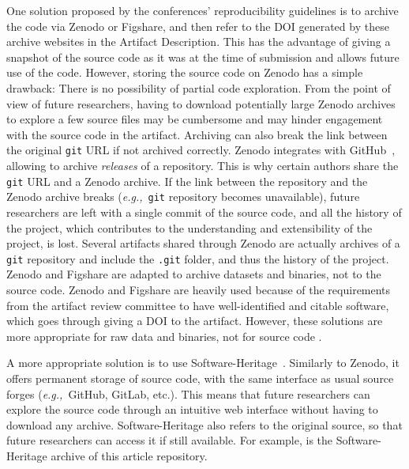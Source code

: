 \documentclass[sigconf,natbib=false]{acmart}
\newcommand{\eg}{\emph{e.g.,}}
\newcommand{\ad}{Artifact Description}
\begin{document}
One solution proposed by the conferences' reproducibility guidelines is to archive the code via Zenodo or Figshare, and then refer to the DOI generated by these archive websites in the \ad.
This has the advantage of giving a snapshot of the source code as it was at the time of submission and allows future use of the code.
However, storing the source code on Zenodo has a simple drawback: There is no possibility of partial code exploration.
From the point of view of future researchers, having to download potentially large Zenodo archives to explore a few source files may be cumbersome and may hinder engagement with the source code in the artifact. 
Archiving can also break the link between the original \texttt{git} URL if not archived correctly.
Zenodo integrates with GitHub\ \cite{github_zenodo}, allowing to archive \emph{releases} of a repository.
This is why certain authors share the \texttt{git} URL and a Zenodo archive.
If the link between the repository and the Zenodo archive breaks (\eg\ \texttt{git} repository becomes unavailable), future researchers are left with a single commit of the source code, and all the history of the project, which contributes to the understanding and extensibility of the project, is lost.
Several artifacts shared through Zenodo are actually archives of a \texttt{git} repository and include the \texttt{.git} folder, and thus the history of the project.
Zenodo and Figshare are adapted to archive datasets and binaries, not to the source code.
Zenodo and Figshare are heavily used because of the requirements from the artifact review committee to have well-identified and citable software, which goes through giving a DOI to the artifact.
However, these solutions are more appropriate for raw data and binaries, not for source code \cite{alliez2019attributing, software_heritage_2017}.

A more appropriate solution is to use Software-Heritage\ \cite{swheritage, di2017software}.
Similarly to Zenodo, it offers permanent storage of source code, with the same interface as usual source forges (\eg\ GitHub, GitLab, etc.).
This means that future researchers can explore the source code through an intuitive web interface without having to download any archive.
Software-Heritage also refers to the original source, so that future researchers can access it if still available.
For example, \cite{artefact-lifetime} is the Software-Heritage archive of this article repository.
\end{document}
